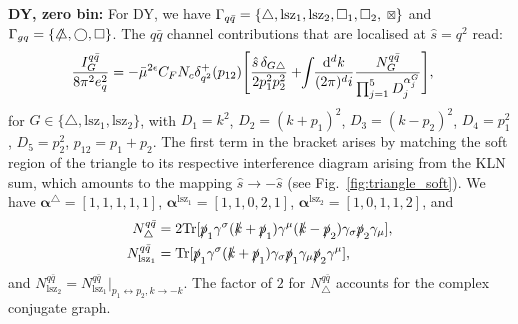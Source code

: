\documentclass[%
 reprint,
 amsmath,amssymb,
 superscriptaddress,
 aps,
 preprintnumbers,
prl,
floatfix,
]{revtex4-2}
\DeclareRobustCommand{\timesbox}{%
  \mathbin{%
    \scalebox{0.8}{
    \ooalign{%
      $\Box$\cr
      \hfil\raisebox{0.2ex}{$\times$}\hfil\cr %
    }%
    }
  }%
}
\begin{document}
\textbf{DY, zero bin:} For DY, we have $\Gamma_{q\bar{q}}=\{\triangle,\allowbreak \text{lsz}_1,\allowbreak\text{lsz}_2,\allowbreak\Box_1,\allowbreak\Box_2,\allowbreak \timesbox\}$ and $\Gamma_{gq}=\{\slashed{\triangle},\allowbreak\bigcirc,\allowbreak \Box\}$.
The $q\bar{q}$ channel contributions that are localised at $\hat{s}=q^2$ read:
\begin{equation}
\begin{aligned}
\frac{I_{G}^{q\bar{q}}}{8\pi^2 e_q^2 }&=-\bar{\mu}^{2\epsilon}C_FN_c \delta_{q^2}^+(p_{12})\Bigg[
\frac{\hat{s}\, \delta_{G\triangle}}
{2p_1^2p_2^2}+\hspace{-0.1cm}\int \hspace{-0.1cm}\frac{\mathrm{d}^d k}{(2\pi)^d i} \frac{N_{G}^{q\bar{q}} }{\prod_{j=1}^5 D_j^{\alpha_j^G}}\Bigg],
\end{aligned}
\end{equation}
for $G\in\{\triangle,\text{lsz}_1,\text{lsz}_2\}$, with $D_1=k^2$, $D_2=(k+p_1)^2$, $D_3=(k-p_2)^2$, $D_4=p_1^2$, $D_5=p_2^2$, $p_{12}=p_1+p_2$. The first term in the bracket arises by matching the soft region of the triangle to its respective interference diagram arising from the KLN sum, which amounts to the mapping $\hat{s}\rightarrow -\hat{s}$ (see Fig.~\ref{fig:triangle_soft}).
We have $\boldsymbol{\alpha}^{\triangle}=[1,1,1,1,1]$, $\boldsymbol{\alpha}^{\text{lsz}_1}=[1,1,0,2,1]$, $\boldsymbol{\alpha}^{\text{lsz}_2}=[1,0,1,1,2]$, and
\begin{align}
N_{\triangle}^{q\bar{q}}&=2\text{Tr}[\slashed{p}_1\gamma^\sigma (\slashed{k}+\slashed{p}_1) \gamma^\mu (\slashed{k}-\slashed{p}_2)\gamma_\sigma \slashed{p}_2\gamma_\mu], \\
N_{\text{lsz}_1}^{q\bar{q}}&=\text{Tr}[\slashed{p}_1\gamma^\sigma (\slashed{k}+\slashed{p}_1) \gamma_\sigma \slashed{p}_1\gamma_\mu \slashed{p}_2\gamma^\mu],
\end{align}
and $N_{\text{lsz}_2}^{q\bar{q}}=N_{\text{lsz}_1}^{q\bar{q}}|_{p_1\leftrightarrow p_2,k\rightarrow -k}$.
The factor of $2$ for $N_{\triangle}^{q\bar{q}}$ accounts for the complex conjugate graph.
\end{document}
